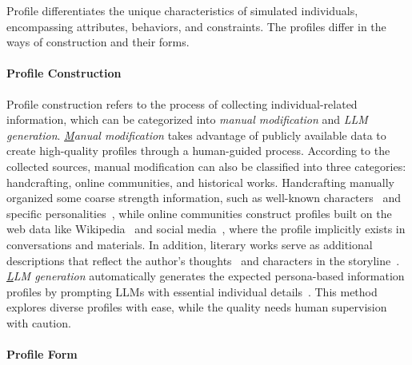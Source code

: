 Profile differentiates the unique characteristics of simulated individuals, encompassing attributes, behaviors, and constraints. The profiles differ in the ways of construction and their forms.

\paragraph{Profile Construction}


Profile construction refers to the process of collecting individual-related information, which can be categorized into \textit{manual modification} and \textit{LLM generation}. 
\textit{{\ul Manual modification}} takes advantage of publicly available data to create high-quality profiles through a human-guided process. According to the collected sources, manual modification can also be classified into three categories:  handcrafting, online communities, and historical works. Handcrafting manually organized some coarse strength information, such as well-known characters~\cite{wang2023humanoidagentsplatformsimulating} and specific personalities~\cite{deshpande2023toxicitychatgptanalyzingpersonaassigned,cheng2023markedpersonasusingnatural}, while online communities construct profiles built on the web data like Wikipedia~\cite{shao2023characterllmtrainableagentroleplaying} and social media~\cite{gao2023livechatlargescalepersonalizeddialogue}, where the profile implicitly exists in conversations and materials.
In addition, literary works serve as additional descriptions that reflect the author's thoughts~\cite{schwitzgebel2023creatinglargelanguagemodel} and characters in the storyline~\cite{brahman2021letcharacterstellstory,li2023chatharuhirevivinganimecharacter}. 
\textit{{\ul LLM generation}} automatically generates the expected persona-based information profiles by prompting LLMs with essential individual details~\cite{tu2023characterchatlearningconversationalai,wang2024rolellmbenchmarkingelicitingenhancing,wang2024incharacterevaluatingpersonalityfidelity}. This method explores diverse profiles with ease, while the quality needs human supervision with caution.


\paragraph{Profile Form}



